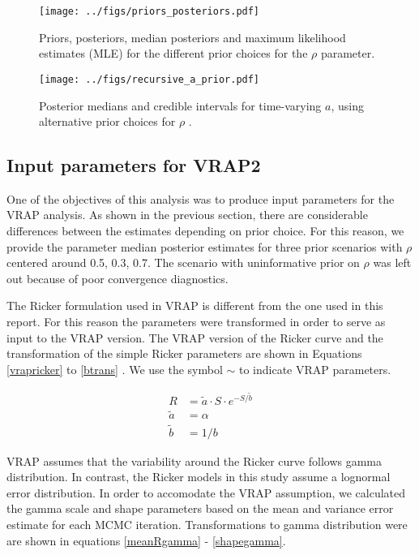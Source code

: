 \documentclass{article}
\begin{document}
\begin{figure}[htbp]
  \centering
  \texttt{[image: ../figs/priors\_posteriors.pdf]}
  \caption{Priors, posteriors, median posteriors and maximum likelihood estimates (MLE) for the different prior choices for the $\rho$ parameter.}
\label{rho_estimates}
\end{figure}


\begin{figure}[htbp]
  \centering
  \texttt{[image: ../figs/recursive\_a\_prior.pdf]}
  \caption{Posterior medians and credible intervals for time-varying $a$, using alternative prior choices for $\rho$ .}
\label{a_estimates_prior}
\end{figure}





\subsection{Input parameters for VRAP2}

One of the objectives of this analysis was to produce input parameters for the VRAP analysis. As shown in the previous section, there are considerable differences between the estimates depending on prior choice. For this reason, we provide the parameter median posterior estimates for three prior scenarios with $\rho$ centered around 0.5, 0.3, 0.7. The scenario with uninformative prior on $\rho$ was left out because of poor convergence diagnostics. 

The Ricker formulation used in VRAP is different from the one used in this report. For this reason the parameters were transformed in order to serve as input to the VRAP version. The VRAP version of the Ricker curve and the transformation of the simple Ricker parameters are shown in Equations \ref{vrapricker} to \ref{btrans} . We use the symbol $\sim$ to indicate VRAP parameters. 



\begin{align} 
\label{vrapricker}
R &= \widetilde{a} \cdot S \cdot e^{-S/\widetilde{b}}\\
\label{atrans}
\widetilde{a} &= \alpha \\
\label{btrans}
\widetilde{b} &= 1/b
\end{align}


VRAP assumes that the variability around the Ricker curve follows gamma distribution. In contrast,  the Ricker models in this study assume a lognormal error distribution. In order to accomodate the VRAP assumption, we calculated the gamma scale and shape parameters based on the mean and variance  error estimate for each MCMC iteration. Transformations to gamma distribution were are shown in equations \ref{meanRgamma} - \ref{shapegamma}.   
\end{document}
